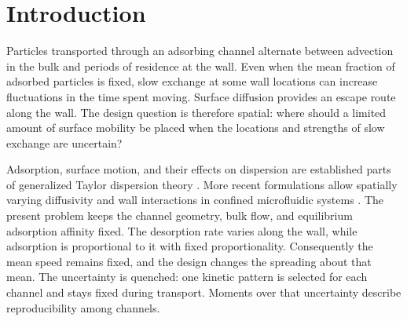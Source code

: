 \begin{abstract}
Weak surface exchange can produce large variations in the spreading of
tracers among nominally similar channels. We study how a fixed integral
budget of tangential surface diffusivity should be distributed when the
exchange pattern is uncertain, and how accurately that pattern must be
measured before placement. For the dimensionless family
$k_c(s)=(c+\cos s)^2$, with $c$ uniform on $[-2,2]$, we prove sharp
small-budget asymptotics over all nonnegative integrable mobility fields.
Predetermined spatial design moves the disorder-moment threshold from
$q=4/3$ for uniform mobility to $q=8/5$, where the optimal moment is
$K_{\rm crit}M^{-2/5}[\log(1/M)]^{7/5}$. Above this threshold an
attained whole-line variational problem supplies the sharp coefficient.
The three optimized orders persist for smooth families with transverse
folds. Exact observation changes the optimal mean from order $M^{-1/4}$
to $M^{-1/5}$. For equal observation bins of width $\Delta$, we prove
the joint law $\mathcal Q\asymp M^{-1/5}+M^{-1/4}\Delta^{1/4}$,
an exact continuous crossover at $\Delta/M^{1/5}=O(1)$, and sharp
endpoint coefficients. A bulk--surface comparison transfers these
scalar optimum laws to stationary flow-induced dispersion at fixed
positive bulk diffusivity. Explicit local certificates, unrestricted
lower bounds, and numerical refinement distinguish asymptotic values
from the performance of finite-budget trial designs.
\end{abstract}

\section{Introduction}
\label{sec:introduction}
Particles transported through an adsorbing channel alternate between
advection in the bulk and periods of residence at the wall. Even when
the mean fraction of adsorbed particles is fixed, slow exchange at some
wall locations can increase fluctuations in the time spent moving.
Surface diffusion provides an escape route along the wall. The design
question is therefore spatial: where should a limited amount of surface
mobility be placed when the locations and strengths of slow exchange
are uncertain?

Adsorption, surface motion, and their effects on dispersion are established
parts of generalized Taylor dispersion theory
\citep{DillBrenner1982,LevesqueEtAl2012}. More recent formulations allow
spatially varying diffusivity and wall interactions in confined
microfluidic systems \citep{AlexandreGuerinDean2021}. The present problem
keeps the channel geometry, bulk flow, and equilibrium adsorption affinity
fixed. The desorption rate varies along the wall, while adsorption is
proportional to it with fixed proportionality. Consequently the mean
speed remains fixed, and the design changes the spreading about that
mean. The uncertainty is quenched: one kinetic pattern is selected for
each channel and stays fixed during transport. Moments over that
uncertainty describe reproducibility among channels.

